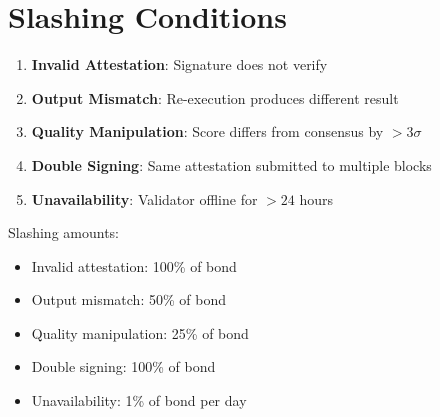 \section{Slashing Conditions}


\begin{enumerate}
    \item \textbf{Invalid Attestation}: Signature does not verify
    \item \textbf{Output Mismatch}: Re-execution produces different result
    \item \textbf{Quality Manipulation}: Score differs from consensus by $> 3\sigma$
    \item \textbf{Double Signing}: Same attestation submitted to multiple blocks
    \item \textbf{Unavailability}: Validator offline for $> 24$ hours
\end{enumerate}

Slashing amounts:
\begin{itemize}
    \item Invalid attestation: 100\% of bond
    \item Output mismatch: 50\% of bond
    \item Quality manipulation: 25\% of bond
    \item Double signing: 100\% of bond
    \item Unavailability: 1\% of bond per day
\end{itemize}


